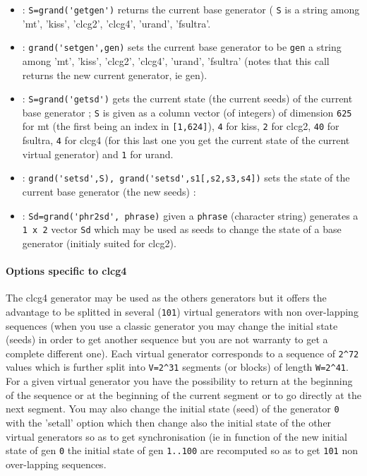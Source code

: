 \begin{itemize}

\item {} : \verb!S=grand('getgen')! returns the current base generator ( \verb!S! is
  a string among 'mt', 'kiss', 'clcg2', 'clcg4', 'urand', 'fsultra'.
\item {} : \verb!grand('setgen',gen)! sets the current base generator to be \verb!gen!
  a string among 'mt', 'kiss', 'clcg2', 'clcg4', 'urand', 'fsultra' (notes that this call 
  returns the new current generator, ie gen).
\item {} : \verb!S=grand('getsd')! gets the current state (the current seeds) of the current base
  generator ; \verb!S! is given as a column vector (of integers) of dimension \verb!625! 
  for mt (the first being an index in \verb![1,624]!), \verb!4! for kiss, \verb!2! 
  for clcg2,  \verb!40! for fsultra, \verb!4! for clcg4 
  (for this last one you get the current state of the current virtual generator) and \verb!1! 
  for urand.
\item {} : \verb!grand('setsd',S), grand('setsd',s1[,s2,s3,s4])! sets the state of the current 
  base generator (the new seeds) :
\item {} : \verb!Sd=grand('phr2sd', phrase)! given a \verb!phrase! (character string) generates 
  a \verb!1 x 2! vector \verb!Sd! which may be used as seeds to change the state of a 
  base generator (initialy suited for clcg2). 
\end{itemize}

\paragraph{Options specific to clcg4}
The clcg4 generator may be used as the others generators but it offers the advantage 
to be splitted in several (\verb!101!) virtual generators with non over-lapping 
sequences (when you use a classic generator you may change the initial state (seeds) 
in order to get another sequence but you are not warranty to get a complete  different one). 
Each virtual generator corresponds to a sequence of \verb!2^72! values which is 
further split into \verb!V=2^31! segments (or blocks) of length \verb!W=2^41!.
For a given virtual generator you have the possibility to return at the beginning of the 
sequence or at the beginning of the current segment or to go directly at the next segment. 
You may also change the initial state (seed) of the generator \verb!0! with the 
'setall' option which then change also the initial state of the other virtual generators 
so as to get synchronisation (ie in function of the new initial state of gen \verb!0! 
the initial state of gen \verb!1..100! are recomputed so as to get \verb!101! 
non over-lapping sequences.   

